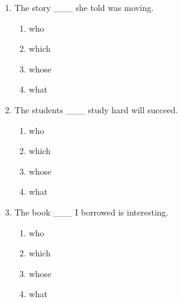 \documentclass[11pt,a4paper]{ctexart}
\begin{document}
\begin{enumerate}[leftmargin=*,itemsep=4pt]
\begin{enumerate}[label=\Alph*.,leftmargin=2em,itemsep=1pt,topsep=2pt]
\item what
\end{enumerate}
\item The story \_\_\_ she told was moving.
\begin{enumerate}[label=\Alph*.,leftmargin=2em,itemsep=1pt,topsep=2pt]
\item who
\item which
\item whose
\item what
\end{enumerate}
\item The students \_\_\_ study hard will succeed.
\begin{enumerate}[label=\Alph*.,leftmargin=2em,itemsep=1pt,topsep=2pt]
\item who
\item which
\item whose
\item what
\end{enumerate}
\item The book \_\_\_ I borrowed is interesting.
\begin{enumerate}[label=\Alph*.,leftmargin=2em,itemsep=1pt,topsep=2pt]
\item who
\item which
\item whose
\item what
\end{enumerate}
\end{enumerate}
\end{document}

